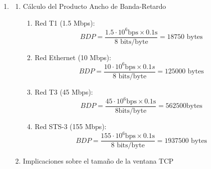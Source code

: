 \begin{enumerate}[label=\color{red}\textbf{\arabic*)}]
\begin{enumerate}[label=\arabic*)]
		            El tiempo de transmisión es lo que tarda el equipo en inyectar todos los bits del paquete en la línea. Se calcula dividiendo el tamaño del paquete $(L)$ entre la velocidad de datos $(R)$.
		            \begin{itemize}[label=\textbullet]
			            \item \textbf{Tamaño del paquete ($L$):} 1 KB = 1024 bytes = 8192 bits
		            \end{itemize}
		      \item Igualación y cálculo de la velocidad ($R$)

		            El problema nos pide que el retardo de ida y vuelta $(RTT)$ sea igual al tiempo de transmisión: \[
			            RTT=\dfrac{L}{R}
		            \]
		            Despejamos la velocidad de datos $(R)$: \[
			            R=\dfrac{L}{RTT}=\dfrac{8192\text{bits}}{0.0002\mathrm{s}}=40960000\mathrm{bps}
		            \]
	      \end{enumerate}
	      Para que el retardo de ida y vuelta sea exactamente igual al retardo de transmisión de un paquete de 1 KB a una distancia de 20 km, la velocidad de datos de la red debe ser de \textbf{40.96 Mbps}.
	\item {}
	      \begin{enumerate}[label=\arabic*)]
		      \item Cálculo del Producto Ancho de Banda-Retardo
		            \begin{enumerate}[label=\arabic*)]
			            \item Red T1 (1.5 Mbps): \[
				                  BDP=\dfrac{1.5\cdot 10^6 \mathrm{bps}\times 0.1\mathrm{s}}{8\text{ bits/byte}}=18750\text{ bytes}
			                  \]
			            \item Red Ethernet (10 Mbps): \[
				                  BDP=\dfrac{10\cdot 10^{6}\mathrm{bps}\times 0.1s}{8\text{ bits/byte}}=125000\text{ bytes}
			                  \]
			            \item Red T3 (45 Mbps):
			                  \[
				                  BDP=\dfrac{45\cdot 10^6\mathrm{bps}\times 0.1\mathrm{s}}{8 \text{bits/byte}}=562500 \text{bytes}
			                  \]
			            \item Red STS-3 (155 Mbps):
			                  \[
				                  BDP=\dfrac{155\cdot 10^6\mathrm{bps}\times 0.1\mathrm{s}}{8\text{ bits/byte}}=1937500\text{ bytes}
			                  \]
		            \end{enumerate}
		      \item Implicaciones sobre el tamaño de la ventana TCP


\end{enumerate}
\end{enumerate}
